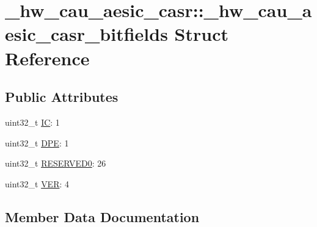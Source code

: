 \hypertarget{struct__hw__cau__aesic__casr_1_1__hw__cau__aesic__casr__bitfields}{}\section{\+\_\+hw\+\_\+cau\+\_\+aesic\+\_\+casr\+:\+:\+\_\+hw\+\_\+cau\+\_\+aesic\+\_\+casr\+\_\+bitfields Struct Reference}
\label{struct__hw__cau__aesic__casr_1_1__hw__cau__aesic__casr__bitfields}
\subsection*{Public Attributes}
\begin{DoxyCompactItemize}
\item 
uint32\+\_\+t \hyperlink{struct__hw__cau__aesic__casr_1_1__hw__cau__aesic__casr__bitfields_ac337c16d1bba34388f02405f5d1a117e}{IC}\+: 1
\item 
uint32\+\_\+t \hyperlink{struct__hw__cau__aesic__casr_1_1__hw__cau__aesic__casr__bitfields_a9c81910875a7f3d1473e26cae934ce61}{D\+PE}\+: 1
\item 
uint32\+\_\+t \hyperlink{struct__hw__cau__aesic__casr_1_1__hw__cau__aesic__casr__bitfields_a669627aee543ff2c8e974253845b7256}{R\+E\+S\+E\+R\+V\+E\+D0}\+: 26
\item 
uint32\+\_\+t \hyperlink{struct__hw__cau__aesic__casr_1_1__hw__cau__aesic__casr__bitfields_a2bf2fe8200eabf9fd8a7c33d883a7f2a}{V\+ER}\+: 4
\end{DoxyCompactItemize}


\subsection{Member Data Documentation}
